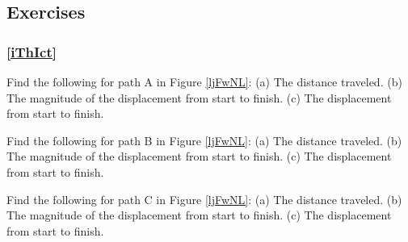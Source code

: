 \documentclass[main-ap-physics.tex]{subfiles}
\begin{document}


\clearpage

\subsection{Exercises}

\subsubsection*{\ref{iThIct} }

\begin{center}
\captionsetup{type=figure,margin=1in,font=scriptsize}
\label{ljFwNL}
\end{center}

\begin{exercise}
    Find the following for path A in Figure \ref{ljFwNL}: (a) The distance traveled. (b) The magnitude of the displacement from start to finish. (c) The displacement from start to finish.
\end{exercise}

\begin{exercise}
    Find the following for path B in Figure \ref{ljFwNL}: (a) The distance traveled. (b) The magnitude of the displacement from start to finish. (c) The displacement from start to finish.
\end{exercise}

\begin{exercise}
    Find the following for path C in Figure \ref{ljFwNL}: (a) The distance traveled. (b) The magnitude of the displacement from start to finish. (c) The displacement from start to finish.
\end{exercise}
\end{document}
